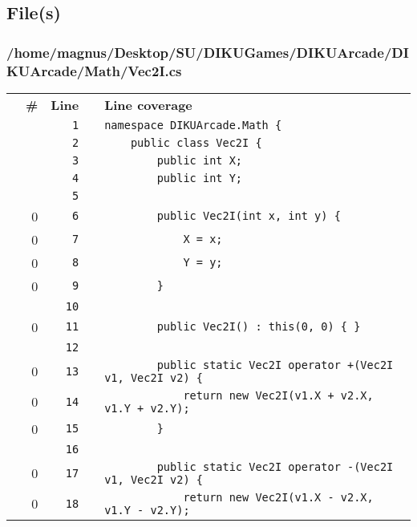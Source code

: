 \documentclass[a4paper,landscape,10pt]{article}
\begin{document}
\subsection{File(s)}
\subsubsection{/home/magnus/Desktop/SU/DIKUGames/DIKUArcade/DIKUArcade/Math/Vec2I.cs}
\begin{longtable}[l]{lrrll}
\textbf{} & \textbf{\#} & \textbf{Line} & \textbf{} & \textbf{Line coverage}\\
\cellcolor{gray} &  & \verb~1~ & & \verb~namespace DIKUArcade.Math {~\\
\cellcolor{gray} &  & \verb~2~ & & \verb~    public class Vec2I {~\\
\cellcolor{gray} &  & \verb~3~ & & \verb~        public int X;~\\
\cellcolor{gray} &  & \verb~4~ & & \verb~        public int Y;~\\
\cellcolor{gray} &  & \verb~5~ & & \verb~~\\
\cellcolor{red} & 0 & \verb~6~ & & \verb~        public Vec2I(int x, int y) {~\\
\cellcolor{red} & 0 & \verb~7~ & & \verb~            X = x;~\\
\cellcolor{red} & 0 & \verb~8~ & & \verb~            Y = y;~\\
\cellcolor{red} & 0 & \verb~9~ & & \verb~        }~\\
\cellcolor{gray} &  & \verb~10~ & & \verb~~\\
\cellcolor{red} & 0 & \verb~11~ & & \verb~        public Vec2I() : this(0, 0) { }~\\
\cellcolor{gray} &  & \verb~12~ & & \verb~~\\
\cellcolor{red} & 0 & \verb~13~ & & \verb~        public static Vec2I operator +(Vec2I v1, Vec2I v2) {~\\
\cellcolor{red} & 0 & \verb~14~ & & \verb~            return new Vec2I(v1.X + v2.X, v1.Y + v2.Y);~\\
\cellcolor{red} & 0 & \verb~15~ & & \verb~        }~\\
\cellcolor{gray} &  & \verb~16~ & & \verb~~\\
\cellcolor{red} & 0 & \verb~17~ & & \verb~        public static Vec2I operator -(Vec2I v1, Vec2I v2) {~\\
\cellcolor{red} & 0 & \verb~18~ & & \verb~            return new Vec2I(v1.X - v2.X, v1.Y - v2.Y);~\\

\end{longtable}
\end{document}
